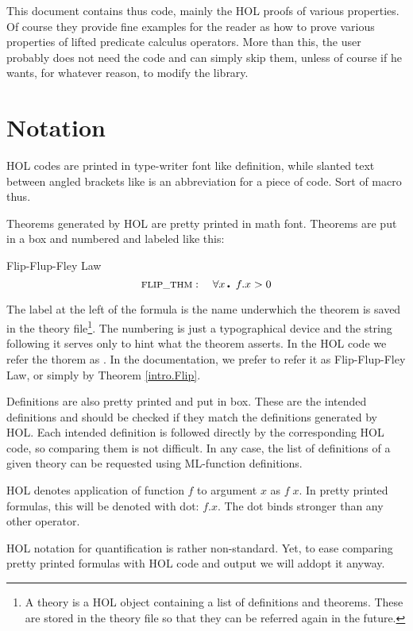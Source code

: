 This document contains thus code, mainly the HOL proofs of various
properties. Of course they provide fine examples for the reader as how
to prove various properties of lifted predicate calculus operators.
More than this, the user probably does not need the code and can
simply skip them, unless of course if he wants, for whatever reason,
to modify the library.

\section{Notation}

HOL codes are printed in type-writer font like \code{}definition\edoc{}, while
slanted text between angled brackets like  is an abbreviation for a piece of code. Sort of macro thus.

Theorems generated by HOL are pretty printed in math font. Theorems
are put in a box and numbered and labeled like this:

\begin{theorem}{Flip-Flup-Fley Law}
\label{intro.Flip}
\[ \thf{FLIP\_THM}:\ \ \ \qA x\Dot f.x > 0 \] 
\end{theorem}

The label  at the left of the formula is the name
underwhich the theorem is saved in the theory file\footnote{A theory
is a HOL object containing a list of definitions and theorems. These
are stored in the theory file so that they can be referred again in
the future.}. The numbering is just a typographical device and the
string following it serves only to hint what the theorem asserts. In
the HOL code we refer the thorem as . In the
documentation, we prefer to refer it as Flip-Flup-Fley Law, or simply
by Theorem \ref{intro.Flip}.

Definitions are also pretty printed and put in box. These are the
intended definitions and should be checked if they match the
definitions generated by HOL. Each intended definition is followed
directly by the corresponding HOL code, so comparing them is not
difficult. In any case, the list of definitions of a given theory can
be requested using ML-function \code{}definitions\edoc{}.

HOL denotes application of function $f$ to argument $x$ as $f\; x$. In
pretty printed formulas, this will be denoted with dot: $f.x$. The dot
binds stronger than any other operator.

HOL notation for quantification is rather non-standard. Yet, to ease
comparing pretty printed formulas with HOL code and output we will
addopt it anyway.


